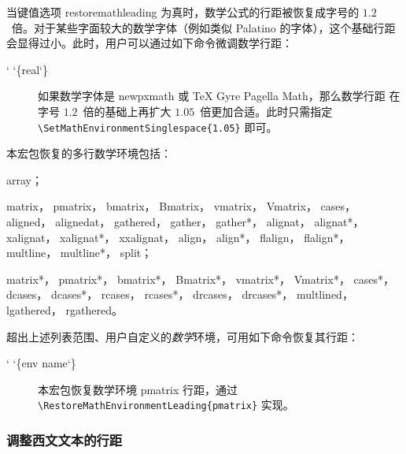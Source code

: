 \documentclass[zihao=5,a4paper]{ctexart}
\makeatletter
\newcommand*\meta{}
\DeclareRobustCommand\meta[1]{%
     \ensuremath\langle
     \ifmmode \expandafter \nfss@text \fi
     {%
      \meta@font@select
      \edef\meta@hyphen@restore
        {\hyphenchar\the\font\the\hyphenchar\font}%
      \hyphenchar\font\m@ne
      \language\l@nohyphenation
      #1\/%
      \meta@hyphen@restore
     }\ensuremath\rangle
}
\def\meta@font@select{\itshape}
\newcommand*\cmd[1]{\cs{\expandafter\cmd@to@cs\string#1}}
\def\cmd@to@cs#1#2{\char\number`#2\relax}
\newcommand*\cs{}
\DeclareRobustCommand\cs[1]{\texttt{\char`\\#1}}
\newcommand\marg[1]{%
  {\ttfamily\char`\{}\meta{#1}{\ttfamily\char`\}}}
\newcommand\pkg[1]{{\normalfont\ttfamily#1}}
\newcommand\opt[1]{{\normalfont\ttfamily#1}}
\newcommand\env[1]{{\normalfont\ttfamily#1}}
\makeatother
\begin{document}
当键值选项 \opt{restoremathleading} 为真时，数学公式的行距被恢复成字号的
$1.2$~倍。对于某些字面较大的数学字体（例如类似 Palatino 的字体），这个基础行距
会显得过小。此时，用户可以通过如下命令微调数学行距：
\begin{description}
\item[\cmd{\SetMathEnvironmentSinglespace}\marg{real}]
如果数学字体是 \pkg{newpxmath} 或 TeX Gyre Pagella Math，那么数学行距
在字号 $1.2$~倍的基础上再扩大 $1.05$~倍更加合适。此时只需指定
\verb|\SetMathEnvironmentSinglespace{1.05}| 即可。
\end{description}
本宏包恢复的多行数学环境包括：
\begin{description}
\linespread{1.05}\selectfont
\raggedright
\item[\LaTeX 环境]
\env{array}；
\item[\pkg{amsmath} 宏包各环境]
\env{matrix}，
\env{pmatrix}，
\env{bmatrix}，
\env{Bmatrix}，
\env{vmatrix}，
\env{Vmatrix}，
\env{cases}，
\env{aligned}，
\env{alignedat}，
\env{gathered}，
\env{gather}，
\env{gather*}，
\env{alignat}，
\env{alignat*}，
\env{xalignat}，
\env{xalignat*}，
\env{xxalignat}，
\env{align}，
\env{align*}，
\env{flalign}，
\env{flalign*}，
\env{multline}，
\env{multline*}，
\env{split}；
\item[\pkg{mathtools} 宏包各环境]
\env{matrix*}，
\env{pmatrix*}，
\env{bmatrix*}，
\env{Bmatrix*}，
\env{vmatrix*}，
\env{Vmatrix*}，
\env{cases*}，
\env{dcases}，
\env{dcases*}，
\env{rcases}，
\env{rcases*}，
\env{drcases}，
\env{drcases*}，
\env{multlined}，
\env{lgathered}，
\env{rgathered}。
\end{description}
超出上述列表范围、用户自定义的\emph{数学}环境，可用如下命令恢复其行距：
\begin{description}
\item[\cmd{\RestoreMathEnvironmentLeading}\marg{env name}]
本宏包恢复数学环境 \env{pmatrix} 行距，通过
\verb|\RestoreMathEnvironmentLeading{pmatrix}| 实现。
\end{description}

\subsubsection{调整西文文本的行距}
\end{document}
